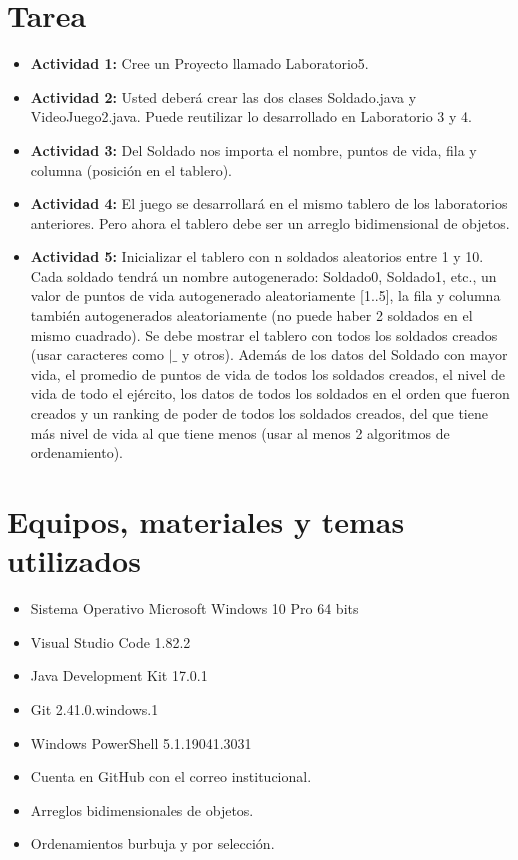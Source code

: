 \documentclass{article}
\begin{document}
\section{Tarea}
\begin{itemize}
	\item \textbf{Actividad 1:} Cree un Proyecto llamado Laboratorio5.
	\item \textbf{Actividad 2:} Usted deberá crear las dos clases Soldado.java y VideoJuego2.java. Puede reutilizar lo
	      desarrollado en Laboratorio 3 y 4.
	\item \textbf{Actividad 3:} Del Soldado nos importa el nombre, puntos de vida, fila y columna (posición en el tablero).
	\item \textbf{Actividad 4:} El juego se desarrollará en el mismo tablero de los laboratorios anteriores. Pero ahora el
	      tablero debe ser un arreglo bidimensional de objetos.
	\item \textbf{Actividad 5:} Inicializar el tablero con n soldados aleatorios entre 1 y 10. Cada soldado tendrá un nombre
	      autogenerado: Soldado0, Soldado1, etc., un valor de puntos de vida autogenerado
	      aleatoriamente [1..5], la fila y columna también autogenerados aleatoriamente (no puede
	      haber 2 soldados en el mismo cuadrado). Se debe mostrar el tablero con todos los soldados
	      creados (usar caracteres como $\mid \_$ y otros). Además de los datos del Soldado con mayor vida,
	      el promedio de puntos de vida de todos los soldados creados, el nivel de vida de todo el
	      ejército, los datos de todos los soldados en el orden que fueron creados y un ranking de poder
	      de todos los soldados creados, del que tiene más nivel de vida al que tiene menos (usar al
	      menos 2 algoritmos de ordenamiento).
\end{itemize}
\pagebreak

\section{Equipos, materiales y temas utilizados}
\begin{itemize}
	\item Sistema Operativo Microsoft Windows 10 Pro 64 bits
	\item Visual Studio Code 1.82.2
	\item Java Development Kit 17.0.1
	\item Git 2.41.0.windows.1
	\item Windows PowerShell 5.1.19041.3031
	\item Cuenta en GitHub con el correo institucional.
	\item Arreglos bidimensionales de objetos.
	\item Ordenamientos burbuja y por selección.
\end{itemize}
\end{document}
